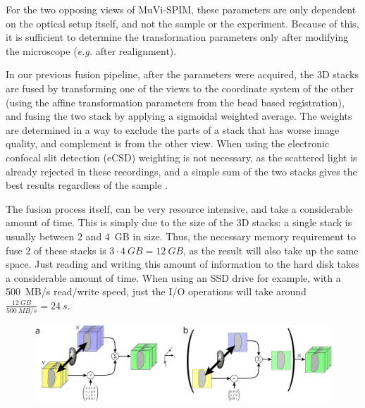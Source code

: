 For the two opposing views of MuVi-SPIM, these parameters are only dependent on the optical setup itself, and not the sample or the experiment. Because of this, it is sufficient to determine the transformation parameters only after modifying the microscope (\textit{e.g.} after realignment).

In our previous fusion pipeline, after the parameters were acquired, the 3D stacks are fused by transforming one of the views to the coordinate system of the other (using the affine transformation parameters from the bead based registration), and fusing the two stack by applying a sigmoidal weighted average. The weights are determined in a way to exclude the parts of a stack that has worse image quality, and complement is from the other view. When using the electronic confocal slit detection (eCSD) weighting is not necessary, as the scattered light is already rejected in these recordings, and a simple sum of the two stacks gives the best results regardless of the sample \cite{de_medeiros_confocal_2015}.

The fusion process itself, can be very resource intensive, and take a considerable amount of time. This is simply due to the size of the 3D stacks: a single stack is usually between 2 and \SI{4}{GB} in size. Thus, the necessary memory requirement to fuse 2 of these stacks is $3\cdot \SI{4}{GB} = \SI{12}{GB}$, as the result will also take up the same space. Just reading and writing this amount of information to the hard disk takes a considerable amount of time. When using an SSD drive for example, with a \SI{500}{MB/s} read/write speed, just the I/O operations will take around $\frac{\SI{12}{GB}}{\SI{500}{MB/s}} = \SI{24}{s}$.


\begin{figure}
  \centering
  \includegraphics[width=1\columnwidth]{fusion/acquisition}
  \label{fig:acquisition}
\end{figure}


